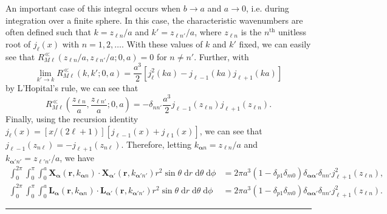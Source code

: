 \documentclass{article}
\begin{document}
An important case of this integral occurs when $b\to a$ and $a\to0$, i.e. during integration over a finite sphere. In this case, the characteristic wavenumbers are often defined such that $k = z_{\ell n}/a$ and $k' = z_{\ell n'}/a$, where $z_{\ell n}$ is the $n^\mathrm{th}$ unitless root of $j_\ell(x)$ with $n = 1,2,\ldots$. With these values of $k$ and $k'$ fixed, we can easily see that $R_{M\ell}^\ll(z_{\ell n}/a,z_{\ell n'}/a;0,a) = 0$ for $n\neq n'$. Further, with
\begin{equation}
\lim_{k'\to k}R_{M\ell}^\ll(k,k';0,a) = \frac{a^3}{2}\left[j_\ell^2(ka) - j_{\ell - 1}(ka)j_{\ell + 1}(ka)\right]
\end{equation}
by L'Hopital's rule, we can see that
\begin{equation}
R_{M\ell}^\ll\left(\frac{z_{\ell n}}{a},\frac{z_{\ell n'}}{a};0,a\right) = -\delta_{nn'}\frac{a^3}{2}j_{\ell - 1}(z_{\ell n})j_{\ell + 1}(z_{\ell n}).
\end{equation}
Finally, using the recursion identity $j_\ell(x) = [x/(2\ell + 1)][j_{\ell - 1}(x) + j_{\ell 1}(x)]$, we can see that $j_{\ell - 1}(z_{n\ell}) = -j_{\ell + 1}(z_{n\ell})$. Therefore, letting $k_{\bm{\alpha}n} = z_{\ell n}/a$ and $k_{\bm{\alpha}'n'} = z_{\ell'n'}/a$, we have
\begin{equation}
\begin{split}
\int_0^{2\pi}\int_0^\pi\int_0^a\mathbf{X}_{\bm{\alpha}}(\mathbf{r},k_{\bm{\alpha}n})\cdot\mathbf{X}_{\bm{\alpha}'}(\mathbf{r},k_{\bm{\alpha}'n'})r^2\sin\theta\;\mathrm{d}r\;\mathrm{d}\theta\;\mathrm{d}\phi &= 2\pi a^3(1 - \delta_{p1}\delta_{m0})\delta_{\bm{\alpha}\bm{\alpha}'}\delta_{nn'}j_{\ell + 1}^2(z_{\ell n}),\\
\int_0^{2\pi}\int_0^\pi\int_0^a\mathbf{L}_{\bm{\alpha}}(\mathbf{r},k_{\bm{\alpha}n})\cdot\mathbf{L}_{\bm{\alpha}'}(\mathbf{r},k_{\bm{\alpha}'n'})r^2\sin\theta\;\mathrm{d}r\;\mathrm{d}\theta\;\mathrm{d}\phi &= 2\pi a^3(1 - \delta_{p1}\delta_{m0})\delta_{\bm{\alpha}\bm{\alpha}'}\delta_{nn'}j_{\ell + 1}^2(z_{\ell n}).
\end{split}
\end{equation}

\noindent\rule{\textwidth}{0.5pt}\\
\end{document}
